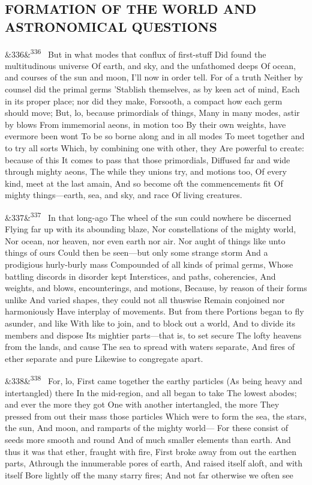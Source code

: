 \documentclass[12pt]{article}
\newcommand{\para}[1][]{\par\noindent\ifx&#1&\else\textsuperscript{\footnotesize #1}~\fi}
\begin{document}
\subsection*{FORMATION OF THE WORLD AND ASTRONOMICAL QUESTIONS}

\para[336] But in what modes that conflux of first-stuff Did found the multitudinous universe Of earth, and sky, and the unfathomed deeps Of ocean, and courses of the sun and moon, I'll now in order tell. For of a truth Neither by counsel did the primal germs 'Stablish themselves, as by keen act of mind, Each in its proper place; nor did they make, Forsooth, a compact how each germ should move; But, lo, because primordials of things, Many in many modes, astir by blows From immemorial aeons, in motion too By their own weights, have evermore been wont To be so borne along and in all modes To meet together and to try all sorts Which, by combining one with other, they Are powerful to create: because of this It comes to pass that those primordials, Diffused far and wide through mighty aeons, The while they unions try, and motions too, Of every kind, meet at the last amain, And so become oft the commencements fit Of mighty things---earth, sea, and sky, and race Of living creatures.

\para[337] In that long-ago The wheel of the sun could nowhere be discerned Flying far up with its abounding blaze, Nor constellations of the mighty world, Nor ocean, nor heaven, nor even earth nor air. Nor aught of things like unto things of ours Could then be seen---but only some strange storm And a prodigious hurly-burly mass Compounded of all kinds of primal germs, Whose battling discords in disorder kept Interstices, and paths, coherencies, And weights, and blows, encounterings, and motions, Because, by reason of their forms unlike And varied shapes, they could not all thuswise Remain conjoined nor harmoniously Have interplay of movements. But from there Portions began to fly asunder, and like With like to join, and to block out a world, And to divide its members and dispose Its mightier parts---that is, to set secure The lofty heavens from the lands, and cause The sea to spread with waters separate, And fires of ether separate and pure Likewise to congregate apart.

\para[338] For, lo, First came together the earthy particles (As being heavy and intertangled) there In the mid-region, and all began to take The lowest abodes; and ever the more they got One with another intertangled, the more They pressed from out their mass those particles Which were to form the sea, the stars, the sun, And moon, and ramparts of the mighty world--- For these consist of seeds more smooth and round And of much smaller elements than earth. And thus it was that ether, fraught with fire, First broke away from out the earthen parts, Athrough the innumerable pores of earth, And raised itself aloft, and with itself Bore lightly off the many starry fires; And not far otherwise we often see
\end{document}
